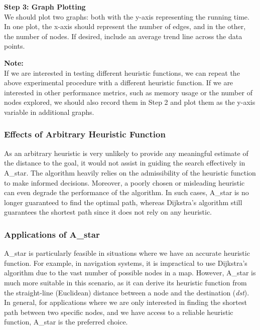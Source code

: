 \documentclass{article}
\begin{document}
\begin{onehalfspace}
\vspace{0.5em}
\textbf{Step 3: Graph Plotting} \\
We should plot two graphs: both with the y-axis representing the running time. In one plot, the x-axis should represent the number of edges, and in the other, the number of nodes. If desired, include an average trend line across the data points.

\vspace{0.5em}
\textbf{Note:} \\
If we are interested in testing different heuristic functions, we can repeat the above experimental procedure with a different heuristic function. If we are interested in other performance metrics, such as memory usage or the number of nodes explored, we should also record them in Step 2 and plot them as the y-axis variable in additional graphs.


\subsubsection*{Effects of Arbitrary Heuristic Function}

As an arbitrary heuristic is very unlikely to provide any meaningful estimate of the distance to the goal, it would not assist in guiding the search effectively in A\_star. The algorithm heavily relies on the admissibility of the heuristic function to make informed decisions. Moreover, a poorly chosen or misleading heuristic can even degrade the performance of the algorithm. In such cases, A\_star is no longer guaranteed to find the optimal path, whereas Dijkstra's algorithm still guarantees the shortest path since it does not rely on any heuristic.





\subsubsection*{Applications of A\_star}
A\_star is particularly feasible in situations where we have an accurate heuristic function. For example, in navigation systems, it is impractical to use Dijkstra’s algorithm due to the vast number of possible nodes in a map. However, A\_star is much more suitable in this scenario, as it can derive its heuristic function from the straight-line (Euclidean) distance between a node and the destination (\textit{dst}). In general, for applications where we are only interested in finding the shortest path between two specific nodes, and we have access to a reliable heuristic function, A\_star is the preferred choice.




\end{onehalfspace}
\end{document}
